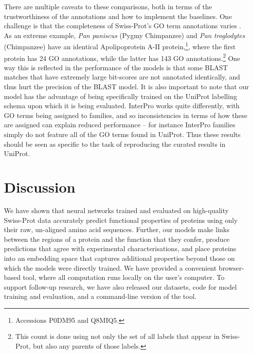 There are multiple caveats to these comparisons, both in terms of the trustworthiness of the annotations and how to implement the baselines. One challenge is that the completeness of Swiss-Prot's GO term annotations varies \cite{jiang2014impact}. As an extreme example, \textit{Pan paniscus} (Pygmy Chimpanzee) and \textit{Pan troglodytes} (Chimpanzee) have an identical Apolipoprotein A-II protein,\footnote{Accessions P0DM95 and Q8MIQ5.}, where the first protein has 24 GO annotations, while the latter has 143 GO annotations.\footnote{This count is done using not only the set of all labels that appear in Swiss-Prot, but also any parents of those labels.} One way this is reflected in the performance of the models is that some BLAST matches that have extremely large bit-scores are not annotated identically, and thus hurt the precision of the BLAST model. It is also important to note that our model has the advantage of being specifically trained on the UniProt labelling schema upon which it is being evaluated. InterPro works quite differently, with GO terms being assigned to families, and so inconsistencies in terms of how these are assigned can explain reduced performance -- for instance InterPro families simply do not feature all of the GO terms found in UniProt. Thus these results should be seen as specific to the task of reproducing the curated results in UniProt.

\section*{Discussion}

We have shown that neural networks trained and evaluated on high-quality Swiss-Prot data accurately predict functional properties of proteins using only their raw, un-aligned amino acid sequences. Further, our models make links between the regions of a protein and the function that they confer, produce predictions that agree with experimental characterisations, and place proteins into an embedding space that captures additional properties beyond those on which the models were directly trained. We have provided a convenient browser-based tool, where all computation runs locally on the user's computer. To support follow-up research, we have also released our datasets, code for model training and evaluation, and a command-line version of the tool.

